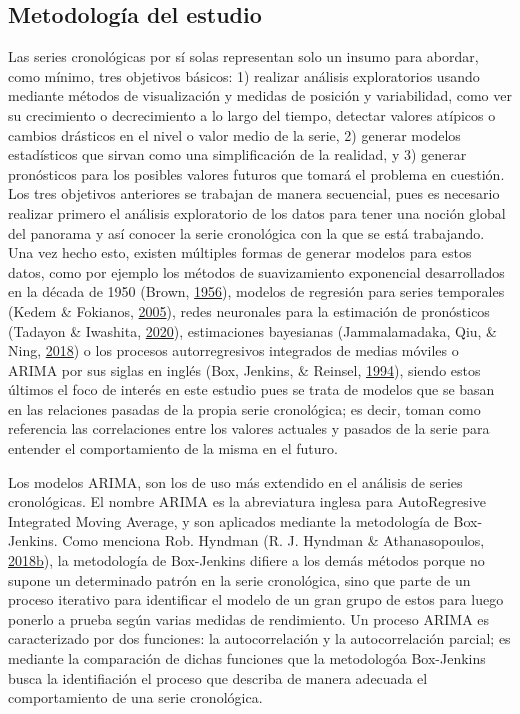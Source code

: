 \documentclass[
]{article}
\begin{document}
\subsection{Metodología del estudio}

Las series cronológicas por sí solas representan solo un insumo para
abordar, como mínimo, tres objetivos básicos: 1) realizar análisis
exploratorios usando mediante métodos de visualización y medidas de
posición y variabilidad, como ver su crecimiento o decrecimiento a lo
largo del tiempo, detectar valores atípicos o cambios drásticos en el
nivel o valor medio de la serie, 2) generar modelos estadísticos que
sirvan como una simplificación de la realidad, y 3) generar pronósticos
para los posibles valores futuros que tomará el problema en cuestión.
Los tres objetivos anteriores se trabajan de manera secuencial, pues es
necesario realizar primero el análisis exploratorio de los datos para
tener una noción global del panorama y así conocer la serie cronológica
con la que se está trabajando. Una vez hecho esto, existen múltiples
formas de generar modelos para estos datos, como por ejemplo los métodos
de suavizamiento exponencial desarrollados en la década de 1950 (Brown,
\protect\hyperlink{ref-brown}{1956}), modelos de regresión para series
temporales (Kedem \& Fokianos, \protect\hyperlink{ref-kedem}{2005}),
redes neuronales para la estimación de pronósticos (Tadayon \& Iwashita,
\protect\hyperlink{ref-redes}{2020}), estimaciones bayesianas
(Jammalamadaka, Qiu, \& Ning, \protect\hyperlink{ref-bayes}{2018}) o los
procesos autorregresivos integrados de medias móviles o ARIMA por sus
siglas en inglés (Box, Jenkins, \& Reinsel,
\protect\hyperlink{ref-box-jenkins}{1994}), siendo estos últimos el foco
de interés en este estudio pues se trata de modelos que se basan en las
relaciones pasadas de la propia serie cronológica; es decir, toman como
referencia las correlaciones entre los valores actuales y pasados de la
serie para entender el comportamiento de la misma en el futuro.

Los modelos ARIMA, son los de uso más extendido en el análisis de series
cronológicas. El nombre ARIMA es la abreviatura inglesa para
AutoRegresive Integrated Moving Average, y son aplicados mediante la
metodología de Box-Jenkins. Como menciona Rob. Hyndman (R. J. Hyndman \&
Athanasopoulos,
\protect\hyperlink{ref-hyndman_box-jenkins}{2018}\protect\hyperlink{ref-hyndman_box-jenkins}{b}),
la metodología de Box-Jenkins difiere a los demás métodos porque no
supone un determinado patrón en la serie cronológica, sino que parte de
un proceso iterativo para identificar el modelo de un gran grupo de
estos para luego ponerlo a prueba según varias medidas de rendimiento.
Un proceso ARIMA es caracterizado por dos funciones: la autocorrelación
y la autocorrelación parcial; es mediante la comparación de dichas
funciones que la metodologóa Box-Jenkins busca la identifiación el
proceso que describa de manera adecuada el comportamiento de una serie
cronológica.
\end{document}
